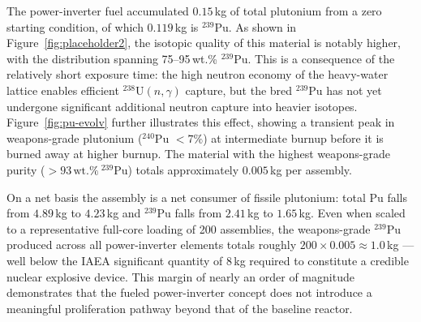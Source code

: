 The power-inverter fuel accumulated $0.15$\,kg of total plutonium from a zero starting condition, of which $0.119$\,kg is $^{239}$Pu. As shown in Figure~\ref{fig:placeholder2}, the isotopic quality of this material is notably higher, with the distribution spanning 75–95\,wt.\% $^{239}$Pu. This is a consequence of the relatively short exposure time: the high neutron economy of the heavy-water lattice enables efficient $^{238}$U$(n,\gamma)$ capture, but the bred $^{239}$Pu has not yet undergone significant additional neutron capture into heavier isotopes. Figure~\ref{fig:pu-evolv} further illustrates this effect, showing a transient peak in weapons-grade plutonium ($^{240}$Pu $< 7\%$) at intermediate burnup before it is burned away at higher burnup. The material with the highest weapons-grade purity ($> 93\,\text{wt.\%}\ ^{239}$Pu) totals approximately $0.005$\,kg per assembly.

On a net basis the assembly is a net consumer of fissile plutonium: total Pu falls from $4.89$\,kg to $4.23$\,kg and $^{239}$Pu falls from $2.41$\,kg to $1.65$\,kg. Even when scaled to a representative full-core loading of 200 assemblies, the weapons-grade $^{239}$Pu produced across all power-inverter elements totals roughly $200 \times 0.005 \approx 1.0$\,kg — well below the IAEA significant quantity of $8$\,kg required to constitute a credible nuclear explosive device. This margin of nearly an order of magnitude demonstrates that the fueled power-inverter concept does not introduce a meaningful proliferation pathway beyond that of the baseline reactor.